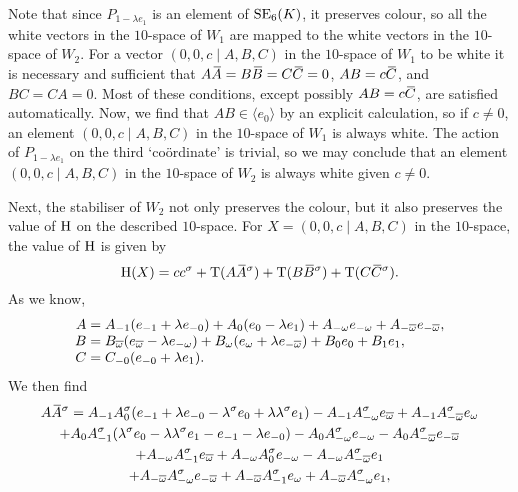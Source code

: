 Note that since $P_{1-\lambda e_1}$ is an element of $\mathrm{SE}_6(K)$, it preserves colour, so all the 
white vectors in the $10$-space of $W_1$ are mapped to the white vectors in the $10$-space of $W_2$.
For a vector $(0,0,c \mid A,B,C)$ in the $10$-space of $W_1$ to be white it is necessary and
sufficient that $A\ovA = B\ovB = C\ovC = 0$, $AB = c\mathord{\mbox{\hspace*{0pt}}\,\overline{\!C\!\!\;}\!\:}\mbox{\hspace*{0pt}}$, and $BC = CA = 0$. Most of these conditions,
except possibly $AB = c\mathord{\mbox{\hspace*{0pt}}\,\overline{\!C\!\!\;}\!\:}\mbox{\hspace*{0pt}}$, are satisfied automatically. Now, we find that $AB \in \langle e_0
\rangle$ by an explicit calculation, so if $c \neq 0$, an element $(0,0,c \mid A,B,C)$ in the 
$10$-space of $W_1$ is always white. The action of $P_{1-\lambda e_1}$ on the third 
`co\"{o}rdinate' is trivial, so we may conclude that an element $(0,0,c \mid A,B,C)$ in the 
$10$-space of $W_2$ is always white given $c \neq 0$. 

Next, the stabiliser of $W_2$ not only preserves the colour, but it also preserves the value 
of $\mathrm{H}$ on the described $10$-space. For $X = (0,0,c\mid A,B,C)$ in the $10$-space, 
the value of $\mathrm{H}$ is given by
\begin{equation}
	\H(X) = c c^{\s} + \Tr(A\ovA^{\s}) + \Tr(B\ovB^{\s}) + \Tr(C\ovC^{\s}). 
\end{equation}
As we know,
\begin{equation}
	\begin{array}{r@{\;}c@{\;}l}
		A & = & A_{-1} (e_{-1} + \lambda e_{-0}) + A_0 (e_0 - \lambda e_1) + 
				A_{-\omega} e_{-\omega} + A_{-\bar{\omega}} e_{-\bar{\omega}}, \\
				
		B & = & B_{\bar{\omega}} ( e_{\bar{\omega}} - \lambda e_{-\omega} ) +
				B_{\omega} ( e_{\omega} + \lambda e_{-\bar{\omega}} ) + 
				B_0 e_0 + B_1 e_1, \\
				
		C & = & C_{-0} ( e_{-0} + \lambda e_1 ).
	\end{array}
\end{equation}
We then find
\begin{multline}
	A\mathord{\mbox{\hspace*{0pt}}\,\overline{\!A\!\!\;}\!\:}\mbox{\hspace*{0pt}}^{\sigma} = A_{-1} A_0^{\sigma} ( e_{-1} + \lambda e_{-0} - \lambda^{\sigma} e_0 + 
						\lambda \lambda^{\sigma} e_1 ) - 
	A_{-1} A_{-\omega}^{\sigma} e_{\overline{\omega}} + A_{-1} A_{-\overline{\omega}}^{\sigma} e_{\omega} \\	
	+ A_0 A_{-1}^{\sigma} (\lambda^{\sigma} e_0 - \lambda \lambda^{\sigma} e_1 - e_{-1} - \lambda e_{-0} ) -
	A_0 A_{-\omega}^{\sigma} e_{-\omega} - A_0 A_{-\overline{\omega}}^{\sigma} e_{-\overline{\omega}} \\	
	+ A_{-\omega} A_{-1}^{\sigma} e_{\overline{\omega}} + A_{-\omega} A_0^{\sigma} e_{-\omega}  - 
	A_{-\omega} A_{-\overline{\omega}}^{\sigma} e_1 \\
	+ A_{-\overline{\omega}} A_{-\omega}^{\sigma} e_{-\overline{\omega}} + 
	A_{-\overline{\omega}} A_{-1}^{\sigma} e_{\omega} + A_{-\overline{\omega}} A_{-\omega}^{\sigma} e_1,
\end{multline}
